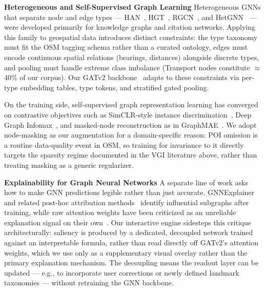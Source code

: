 \documentclass[]{interact}
\theoremstyle{plain}%
\theoremstyle{definition}
\theoremstyle{remark}
\begin{document}
\textbf{Heterogeneous and Self-Supervised Graph Learning}
Heterogeneous GNNs that separate node and edge types --- HAN~\citep{wang2021heterogeneousgraphattentionnetwork}, HGT~\citep{hu2020heterogeneousgraphtransformer}, RGCN~\citep{schlichtkrull2017modelingrelationaldatagraph}, and HetGNN~\citep{10.1145/3292500.3330961} --- were developed primarily for knowledge graphs and citation networks. Applying this family to geospatial data introduces distinct constraints: the type taxonomy must fit the OSM tagging schema rather than a curated ontology, edges must encode continuous spatial relations (bearings, distances) alongside discrete types, and pooling must handle extreme class imbalance (Transport nodes constitute $\approx$40\% of our corpus). Our GATv2 backbone~\citep{brody2022attentivegraphattentionnetworks} adapts to these constraints via per-type embedding tables, type tokens, and stratified gated pooling.

On the training side, self-supervised graph representation learning has converged on contrastive objectives such as SimCLR-style instance discrimination~\citep{DBLP:journals/corr/abs-2002-05709}, Deep Graph Infomax~\citep{velicković2018deepgraphinfomax}, and masked-node reconstruction as in GraphMAE~\citep{hou2022graphmaeselfsupervisedmaskedgraph}. We adopt node-masking as our augmentation for a domain-specific reason: POI omission is a routine data-quality event in OSM, so training for invariance to it directly targets the sparsity regime documented in the VGI literature above, rather than treating masking as a generic regularizer.

\textbf{Explainability for Graph Neural Networks}
A separate line of work asks how to make GNN predictions legible rather than just accurate. GNNExplainer~\citep{ying2019gnnexplainergeneratingexplanationsgraph} and related post-hoc attribution methods~\citep{kakkad2023surveyexplainabilitygraphneural} identify influential subgraphs after training, while raw attention weights have been criticized as an unreliable explanation signal on their own~\citep{jain2019attentionexplanation, serrano2019attentioninterpretable}. Our interactive engine sidesteps this critique architecturally: saliency is produced by a dedicated, decoupled network trained against an interpretable formula, rather than read directly off GATv2's attention weights, which we use only as a supplementary visual overlay rather than the primary explanation mechanism. The decoupling means the readout layer can be updated --- e.g., to incorporate user corrections or newly defined landmark taxonomies --- without retraining the GNN backbone.
\end{document}
